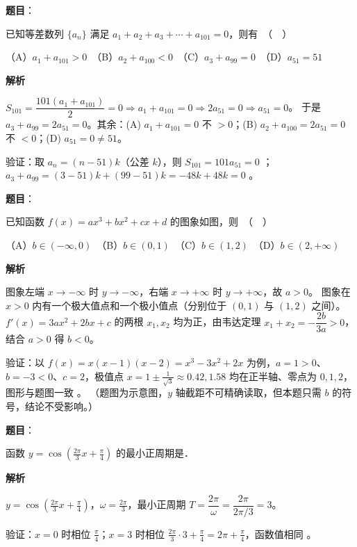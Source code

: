 \begin{answer}

\textbf{题目}：

已知等差数列 $\{a_n\}$ 满足 $a_1 + a_2 + a_3 + \cdots + a_{101} = 0$，则有　（　）

（A）$a_1 + a_{101} > 0$　（B）$a_2 + a_{100} < 0$　（C）$a_3 + a_{99} = 0$　（D）$a_{51} = 51$

\textbf{解析}

$S_{101}=\dfrac{101(a_1+a_{101})}{2}=0\Rightarrow a_1+a_{101}=0\Rightarrow 2a_{51}=0\Rightarrow a_{51}=0$。
于是 $a_3+a_{99}=2a_{51}=0$。其余：(A) $a_1+a_{101}=0$ 不 $>0$；(B) $a_2+a_{100}=2a_{51}=0$ 不 $<0$；(D) $a_{51}=0\ne51$。

验证：取 $a_n=(n-51)k$（公差 $k$），则 $S_{101}=101a_{51}=0$ ；$a_3+a_{99}=(3-51)k+(99-51)k=-48k+48k=0$ 。


\end{answer}
\begin{answer}

\textbf{题目}：

已知函数 $f(x) = ax^3 + bx^2 + cx + d$ 的图象如图，则　（　）
\nopagebreak[4]
\begin{center}\end{center}
\nopagebreak[4]
（A）$b \in (-\infty, 0)$　（B）$b \in (0, 1)$　（C）$b \in (1, 2)$　（D）$b \in (2, +\infty)$

\textbf{解析}

图象左端 $x\to-\infty$ 时 $y\to-\infty$，右端 $x\to+\infty$ 时 $y\to+\infty$，故 $a>0$。
图象在 $x>0$ 内有一个极大值点和一个极小值点（分别位于 $(0,1)$ 与 $(1,2)$ 之间）。$f'(x)=3ax^2+2bx+c$ 的两根 $x_1,x_2$ 均为正，由韦达定理 $x_1+x_2=-\dfrac{2b}{3a}>0$，结合 $a>0$ 得 $b<0$。

验证：以 $f(x)=x(x-1)(x-2)=x^3-3x^2+2x$ 为例，$a=1>0$、$b=-3<0$、$c=2$，极值点 $x=1\pm\frac{1}{\sqrt3}\approx0.42,1.58$ 均在正半轴、零点为 $0,1,2$，图形与题图一致 。
（题图为示意图，$y$ 轴截距不可精确读取，但本题只需 $b$ 的符号，结论不受影响。）


\end{answer}
\begin{answer}

\textbf{题目}：

函数 $y = \cos\left(\frac{2\pi}{3}x + \frac{\pi}{4}\right)$ 的最小正周期是\gkblank{}．

\textbf{解析}

$y=\cos\!\left(\frac{2\pi}{3}x+\frac\pi4\right)$，$\omega=\frac{2\pi}{3}$，最小正周期 $T=\dfrac{2\pi}{\omega}=\dfrac{2\pi}{2\pi/3}=3$。

验证：$x=0$ 时相位 $\frac\pi4$；$x=3$ 时相位 $\frac{2\pi}{3}\cdot3+\frac\pi4=2\pi+\frac\pi4$，函数值相同 。


\end{answer}
